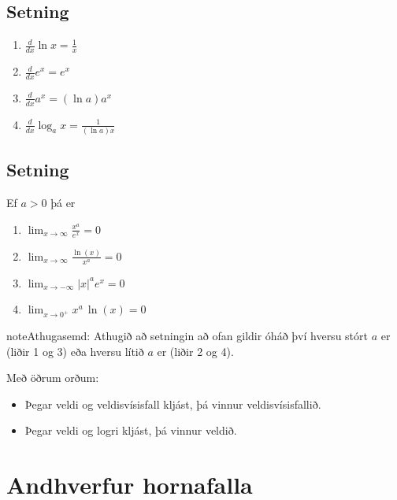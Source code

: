 \documentclass[b5paper,11pt,icelandic]{sphinxmanual}
\begin{document}
\subsection{Setning}
\label{kafli04:id5}\begin{enumerate}
\item {} 
\(\frac{d}{dx}\ln x=\frac 1x\)

\item {} 
\(\frac{d}{dx}e^x=e^x\)

\item {} 
\(\frac{d}{dx}a^x=(\ln a)a^x\)

\item {} 
\(\frac{d}{dx}\log_a x=\frac{1}{(\ln a)x}\)

\end{enumerate}


\subsection{Setning}
\label{kafli04:id6}
Ef \(a>0\) þá er
\begin{enumerate}
\item {} 
\(\lim_{x\to \infty} \frac{x^a}{e^x} = 0\)

\item {} 
\(\lim_{x\to \infty} \frac{\ln(x)}{x^a} = 0\)

\item {} 
\(\lim_{x\to -\infty} |x|^a e^x = 0\)

\item {} 
\(\lim_{x\to 0^+} x^a\, \ln(x) = 0\)

\end{enumerate}

\begin{notice}{note}{Athugasemd:}
Athugið að setningin að ofan gildir óháð því hversu stórt \(a\) er
(liðir 1 og 3) eða hversu lítið \(a\) er (liðir 2 og 4).

Með öðrum orðum:
\begin{itemize}
\item {} 
Þegar veldi og veldisvísisfall kljást, þá vinnur veldisvísisfallið.

\item {} 
Þegar veldi og logri kljást, þá vinnur veldið.

\end{itemize}
\end{notice}


\section{Andhverfur hornafalla}
\label{kafli04:andhverfur-hornafalla}
\end{document}
